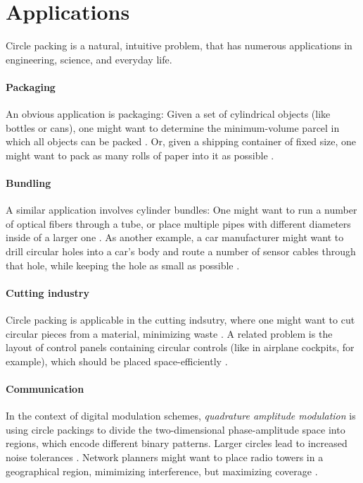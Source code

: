 \documentclass[a4paper,style=print,oneside,bibliography=totoc,nexus,lnum,extramargin]{tubsbook}
\begin{document}
\section{Applications}

Circle packing is a natural, intuitive problem, that has numerous applications in engineering, science, and everyday life.

\paragraph{Packaging}

An obvious application is packaging: Given a set of cylindrical objects (like bottles or cans), one might want to determine the minimum-volume parcel in which all objects can be packed \parencite{CKP2008solving}. Or, given a shipping container of fixed size, one might want to pack as many rolls of paper into it as possible \parencite{fraser1994integrated}.

\paragraph{Bundling}

A similar application involves cylinder bundles:
One might want to run a number of optical fibers through a tube, or place multiple pipes with different diameters inside of a larger one \parencite{WHZX2002improved}. As another example, a car manufacturer might want to drill circular holes into a car's body and route a number of sensor cables through that hole, while keeping the hole as small as possible \cite{SSSKK2004disk}.

\paragraph{Cutting industry}

Circle packing is applicable in the cutting indsutry, where one might want to cut circular pieces from a material, minimizing waste \cite{SMCSCG2007new}.
A related problem is the layout of control panels containing circular controls (like in airplane cockpits, for example), which should be placed space-efficiently \parencite{CKP2008solving}.

\paragraph{Communication}

In the context of digital modulation schemes, \emph{quadrature amplitude modulation} is using circle packings to divide the two-dimensional phase-amplitude space into regions, which encode different binary patterns. Larger circles lead to increased noise tolerances \parencite{PWMD1992packing}.
Network planners might want to place radio towers in a geographical region, mimimizing interference, but maximizing coverage \parencite{SMCSCG2007new}.
\end{document}
